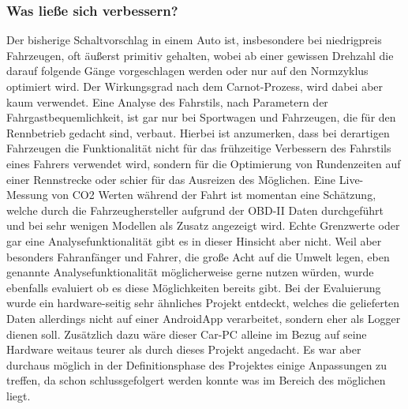 \subsubsection{Was ließe sich verbessern?}
Der bisherige Schaltvorschlag in einem Auto ist, insbesondere bei niedrigpreis Fahrzeugen, oft äußerst primitiv gehalten, wobei ab einer gewissen Drehzahl die darauf folgende Gänge vorgeschlagen werden oder nur auf den Normzyklus optimiert wird. \cite{Schaltempfehlung} Der Wirkungsgrad nach dem Carnot-Prozess, wird dabei aber kaum verwendet. \cite{Carnot.Wirkungsgrad}
\newline
\newline
Eine Analyse des Fahrstils, nach Parametern der Fahrgastbequemlichkeit, ist gar nur bei Sportwagen und Fahrzeugen, die für den Rennbetrieb gedacht sind, verbaut. Hierbei ist anzumerken, dass bei derartigen Fahrzeugen die Funktionalität nicht für das frühzeitige Verbessern des Fahrstils eines Fahrers verwendet wird, sondern für die Optimierung von Rundenzeiten auf einer Rennstrecke oder schier für das Ausreizen des Möglichen.
\newline
\newline
Eine Live-Messung von CO2 Werten während der Fahrt ist momentan eine Schätzung, welche durch die Fahrzeughersteller aufgrund der OBD-II Daten durchgeführt und bei sehr wenigen Modellen als Zusatz angezeigt wird. Echte Grenzwerte oder gar eine Analysefunktionalität gibt es in dieser Hinsicht aber nicht.
\newline
\newline
Weil aber besonders Fahranfänger und Fahrer, die große Acht auf die Umwelt legen, eben genannte Analysefunktionalität möglicherweise gerne nutzen würden, wurde ebenfalls evaluiert ob es diese Möglichkeiten bereits gibt.
Bei der Evaluierung wurde ein hardware-seitig sehr ähnliches Projekt entdeckt, welches die gelieferten Daten allerdings nicht auf einer Android\textregistered App verarbeitet, sondern eher als Logger dienen soll.\cite{LowBudget.CarPC} 
\newline
Zusätzlich dazu wäre dieser Car-PC alleine im Bezug auf seine Hardware weitaus teurer als durch dieses Projekt angedacht. Es war aber durchaus möglich in der Definitionsphase des Projektes einige Anpassungen zu treffen, da schon schlussgefolgert werden konnte was im Bereich des möglichen liegt. 
\newline
\newline
